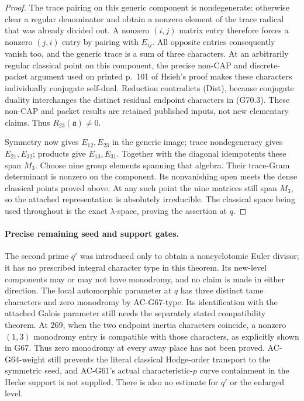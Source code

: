 \begin{proof}
The trace pairing on this generic component is
nondegenerate: otherwise clear a regular denominator
and obtain a nonzero element of the trace radical that
was already divided out.  A nonzero $(i,j)$ matrix entry
therefore forces a nonzero $(j,i)$ entry by pairing with
$E_{ij}$.  All opposite entries consequently vanish too,
and the generic trace is a sum of three characters.
At an arbitrarily regular classical point on this
component, the precise non-CAP and discrete-packet
argument used on printed p.~101 of Hsieh's proof makes
these characters individually conjugate self-dual.
Reduction contradicts \textup{(Dist)}, because conjugate
duality interchanges the distinct residual endpoint
characters in (G70.3).  These non-CAP and packet results
are retained published inputs, not new elementary claims.
Thus $R_{23}(\mathfrak a)\ne0$.

Symmetry now gives $E_{12},E_{23}$ in the generic image;
trace nondegeneracy gives $E_{21},E_{32}$; products give
$E_{13},E_{31}$.  Together with the diagonal idempotents
these span $M_3$.  Choose nine group elements spanning
that algebra.  Their trace-Gram determinant is nonzero
on the component.  Its nonvanishing open meets the dense
classical points proved above.  At any such point the
nine matrices still span $M_3$, so the attached
representation is absolutely irreducible.  The classical
space being used throughout is the exact
$\lambda$-space, proving the assertion at $q$.
\end{proof}

\paragraph{Precise remaining seed and support gates.}
The second prime $q'$ was introduced only to obtain a
noncyclotomic Euler divisor; it has no prescribed integral
character type in this theorem.  Its new-level components
may or may not have monodromy, and no claim is made in
either direction.  The local automorphic parameter at
$q$ has three distinct tame characters and zero monodromy
by AC-G67-type.  Its identification with the attached
Galois parameter still needs the separately stated
compatibility theorem.  At $269$, when the two endpoint
inertia characters coincide, a nonzero $(1,3)$ monodromy
entry is compatible with those characters, as explicitly
shown in G67.  Thus zero monodromy at every away place
has not been proved.  AC-G64-weight still prevents the
literal classical Hodge-order transport to the symmetric
seed, and AC-G61's actual characteristic-$p$ curve
containment in the Hecke support is not supplied.
There is also no estimate for $q'$ or the enlarged level.

